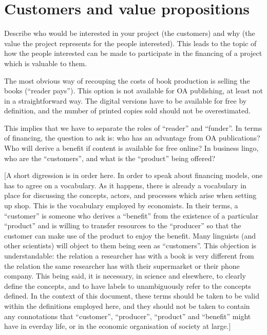 \documentclass[nonflat,smallfont
]{langsci/langscibook}
\newcommand{\background}[1]{ 
  \vspace{5mm}
  \renewcommand{\tblslinecolour}{lsDarkBlue}
  \tblssy[red]{explore2}{Background}{\vspace*{-5mm}#1}
}
\newcommand{\langscisolution}[1]{
  \renewcommand{\tblslinecolour}{lsLightBlue}
  \tblssy{langsci}{LangSci solution}{\vspace*{-5mm}#1}
}
\renewcommand{\tblssy}[4][black!12]{%
  \renewcommand{\langscisymbol}{#2}\renewcommand{\tblsboxcolor}{#1}
  \begin{mdframed}[style=yellowexercise,frametitle={#3}]
    #4
  \end{mdframed}
}
\begin{document}
\section{Customers and value propositions}
\vspace*{5mm}\background{Describe who would be interested in your project (the customers) and why (the value the project represents for the people interested). This leads to the topic of how the people interested can be made to participate in the financing of a project which is valuable to them. 
}
\langscisolution{
The most obvious way of recouping the costs of book production is selling the books (``reader pays''). This option is not available for OA publishing, at least not in a straightforward way. The digital versions have to be available for free by definition, and the number of printed copies sold should not be overestimated. 

This implies that we have to separate the roles of ``reader'' and ``funder''. In terms of financing, the question to ask is: who has an advantage from OA publications? Who will derive a benefit if content is available for free online? In business lingo, who are the ``customers'', and what is the ``product'' being offered? 

[A short digression is in order here. In order to speak about financing models, one has to agree on a vocabulary. As it happens, there is already a vocabulary in place for discussing the concepts, actors, and processes which arise when setting up shop. This is the vocabulary employed by economists. In their terms, a ``customer'' is someone who derives a ``benefit'' from the existence of a particular ``product'' and is willing to transfer resources to the ``producer'' so that the customer can make use of the product to enjoy the benefit. Many linguists (and other scientists) will object to them being seen as ``customers''. This objection is understandable: the relation a researcher has with a book is very different from the relation the same researcher has with their supermarket or their phone company. This being said, it is necessary, in science and elsewhere, to clearly define the concepts, and to have labels to unambiguously refer to the concepts defined. In the context of this document, these terms  should be taken to be valid within the definitions employed here, and they should not be taken to contain any connotations that ``customer'', ``producer'', ``product'' and ``benefit'' might have in everday life, or in the economic organisation of society at large.]

}
\end{document}
